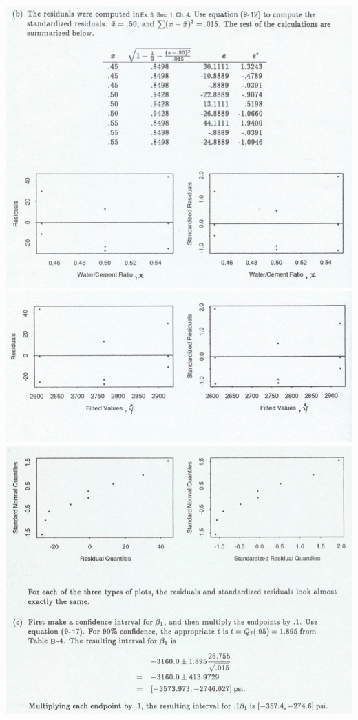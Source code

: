 \documentclass{article}\usepackage{graphicx, color}
\numberwithin{equation}{section}
\begin{document}
\begin{flushleft}
\begin{enumerate}[1. ]
 \includegraphics{../../fig/h11p2sol2.png}
 \includegraphics{../../fig/h11p2sol3.png}
 \includegraphics{../../fig/h11p2sol4.png}

\end{enumerate}
\end{flushleft}
\end{document}

